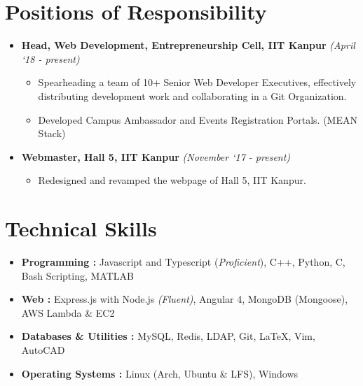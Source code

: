 \documentclass[letterpaper,10pt]{article}
\begin{document}
\section{Positions of Responsibility}
\begin{itemize}[noitemsep]
	\item \textbf{Head, Web Development, Entrepreneurship Cell, IIT Kanpur}	
		\hfill \textit{(April ‘18 - present)}
		\begin{itemize}
			\item Spearheading a team of 10+ Senior Web Developer Executives,	
				effectively distributing development work and collaborating in a Git Organization.
			\item Developed Campus Ambassador and Events Registration Portals. (MEAN Stack)
		\end{itemize}

	\item \textbf{Webmaster, Hall 5, IIT Kanpur}
		\hfill \textit{(November ‘17 - present)}
		\begin{itemize}
			\item Redesigned and revamped the webpage of Hall 5, IIT Kanpur.\vspace*{-8pt}
		\end{itemize}

\end{itemize}\vspace*{-6pt}

\section{Technical Skills}
\begin{itemize}[noitemsep]
	\item
		\textbf{Programming : }
		 Javascript and Typescript (\textit{Proficient}), C++, Python, C, Bash Scripting, MATLAB
	\item
		\textbf{Web : }
		Express.js with Node.js \textit{(Fluent)}, Angular 4, MongoDB (Mongoose), AWS Lambda \& EC2

	\item
	\textbf{Databases \& Utilities : }
		MySQL, Redis, LDAP, Git, \LaTeX, Vim, AutoCAD
	\item
		\textbf{Operating Systems : }
		Linux (Arch, Ubuntu \& LFS), Windows
\vspace*{-5pt}

\end{itemize}
\vspace*{-8pt}
\end{document}
